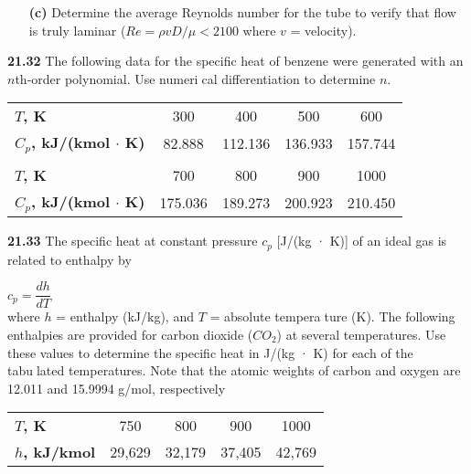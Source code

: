 \begin{multicols}{2}
\begin{enumerate}
	\item[\textbf{(c)}] Determine the average Reynolds number for the tube to
verify that flow is truly laminar ($Re = \rho vD/\mu < 2100$
where $v$ = velocity).
\end{enumerate}


\textbf{21.32} The following data for the specific heat of benzene
were generated with an $n$th-order polynomial. Use numerical differentiation to determine $n$.\\
\begin{tabular}{lcccc}
\hline

	\tiny{\textbf{$T$, K}} & \tiny{300} & \tiny{400} & \tiny{500} & \tiny{600}\\
	
	\tiny{\textbf{$C_{p}$, kJ/(kmol $\cdot$ K)}} &  \tiny{82.888} & \tiny{112.136} & \tiny{136.933} & \tiny{157.744}\\
	
	\vspace{}\\
	
	\tiny{\textbf{$T$, K}} & \tiny{700} & \tiny{800} & \tiny{900} & \tiny{1000}\\
	
	\tiny{\textbf{$C_{p}$, kJ/(kmol $\cdot$ K)}} & \tiny{175.036} & \tiny{189.273} & \tiny{200.923} & \tiny{210.450}\\

\hline
\end{tabular}

\textbf{21.33} The specific heat at constant pressure $c_{p}$ [J/(kg · K)]
of an ideal gas is related to enthalpy by

  $ c_{p} = \dfrac{dh}{dT} $\\
where $h$ = enthalpy (kJ/kg), and $T$ = absolute temperature (K). The following enthalpies are provided for carbon dioxide ($CO_{2}$) at several temperatures. Use these values to
determine the specific heat in J/(kg · K) for each of the tabulated temperatures. Note that the atomic weights of carbon
and oxygen are 12.011 and 15.9994 g/mol, respectively\\
\begin{tabular}{lcccc}
\hline

	\textbf{$T$, K} & 750 & 800 & 900 & 1000\\
	
	\textbf{$h$, kJ/kmol} & 29,629 & 32,179 & 37,405 & 42,769\\

\hline
\end{tabular}



\end{multicols}
